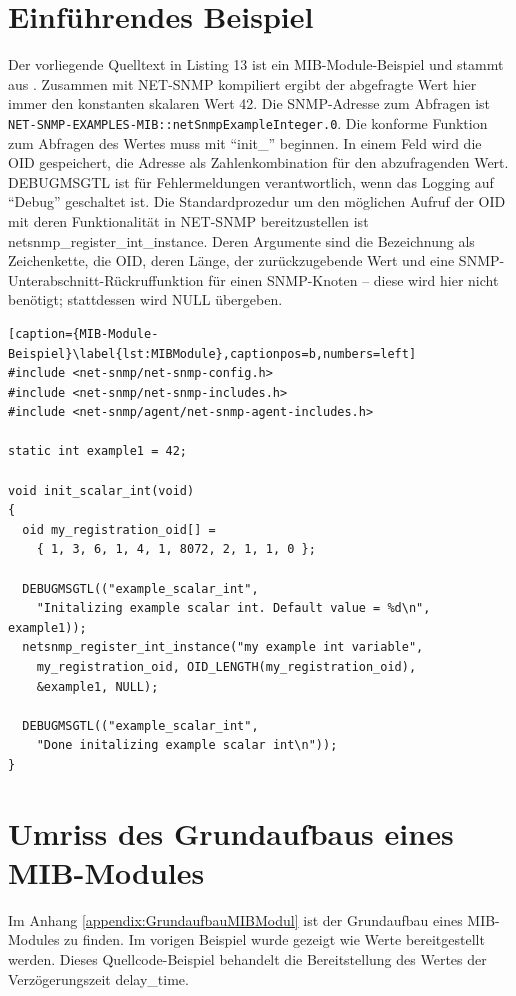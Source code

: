 \documentclass[12pt,ngerman,toc=listofnumbered,toc=bibliographynumbered,toc=index,headsepline=true]{scrbook}
\begin{document}
\section{Einführendes Beispiel}
Der vorliegende Quelltext in Listing 13 ist ein MIB-Module-Beispiel und stammt
aus \cite{NetSNMP11}. Zusammen mit NET-SNMP kompiliert ergibt der abgefragte
Wert hier immer den konstanten skalaren Wert 42. Die SNMP-Adresse zum Abfragen
ist \texttt{NET-SNMP-EXAMPLES-MIB::netSnmpExampleInteger.0}. Die konforme
Funktion zum Abfragen des Wertes muss mit \enquote{init\_} beginnen. In einem
Feld wird die OID gespeichert, die Adresse als Zahlenkombination für den
abzufragenden Wert. DEBUGMSGTL ist für Fehlermeldungen verantwortlich, wenn das
Logging auf \enquote{Debug} geschaltet ist. Die Standardprozedur um den
möglichen Aufruf der OID mit deren Funktionalität in NET-SNMP bereitzustellen
ist \\ netsnmp\_register\_int\_instance. Deren Argumente sind die Bezeichnung als
Zeichenkette, die OID, deren Länge, der zurückzugebende Wert und eine
SNMP-Unterabschnitt-Rückruffunktion für einen SNMP-Knoten -- diese wird hier
nicht benötigt; stattdessen wird NULL übergeben.

\begin{lstlisting}[caption={MIB-Module-Beispiel}\label{lst:MIBModule},captionpos=b,numbers=left]
#include <net-snmp/net-snmp-config.h>
#include <net-snmp/net-snmp-includes.h>
#include <net-snmp/agent/net-snmp-agent-includes.h>

static int example1 = 42;

void init_scalar_int(void)
{
  oid my_registration_oid[] = 
    { 1, 3, 6, 1, 4, 1, 8072, 2, 1, 1, 0 };

  DEBUGMSGTL(("example_scalar_int",
    "Initalizing example scalar int. Default value = %d\n", example1));
  netsnmp_register_int_instance("my example int variable",
    my_registration_oid, OID_LENGTH(my_registration_oid),
    &example1, NULL);

  DEBUGMSGTL(("example_scalar_int",
    "Done initalizing example scalar int\n"));
}
\end{lstlisting}

\section{Umriss des Grundaufbaus eines MIB-Modules}
Im Anhang \ref{appendix:GrundaufbauMIBModul} ist der Grundaufbau eines
MIB-Modules zu finden. Im vorigen Beispiel wurde gezeigt wie Werte
bereitgestellt werden. Dieses Quellcode-Beispiel behandelt die Bereitstellung
des Wertes der Verzögerungszeit delay\_time.
\end{document}
